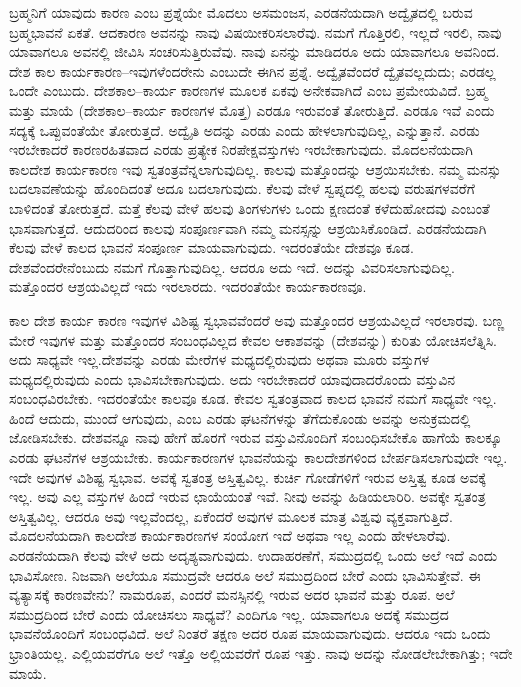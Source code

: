 ಬ್ರಹ್ಮನಿಗೆ ಯಾವುದು ಕಾರಣ ಎಂಬ ಪ್ರಶ್ನೆಯೇ ಮೊದಲು ಅಸಮಂಜಸ, ಎರಡನೆಯದಾಗಿ ಅದ್ವೈತದಲ್ಲಿ ಬರುವ ಬ್ರಹ್ಮಭಾವನೆ ಏಕತೆ. ಆದಕಾರಣ ಅವನನ್ನು ನಾವು ವಿಷಯೀಕರಿಸಲಾರೆವು. ನಮಗೆ ಗೊತ್ತಿರಲಿ, ಇಲ್ಲದೆ ಇರಲಿ, ನಾವು ಯಾವಾಗಲೂ ಅವನಲ್ಲಿ ಜೀವಿಸಿ ಸಂಚರಿಸುತ್ತಿರುವೆವು. ನಾವು ಏನನ್ನು ಮಾಡಿದರೂ ಅದು ಯಾವಾಗಲೂ ಅವನಿಂದ. ದೇಶ ಕಾಲ ಕಾರ್ಯಕಾರಣ–ಇವುಗಳೆಂದರೇನು ಎಂಬುದೇ ಈಗಿನ ಪ್ರಶ್ನೆ. ಅದ್ವೈತವೆಂದರೆ ದ್ವೈತವಲ್ಲದುದು; ಎರಡಲ್ಲ ಒಂದೇ ಎಂಬುದು. ದೇಶಕಾಲ–ಕಾರ್ಯ ಕಾರಣಗಳ ಮೂಲಕ ಏಕವು ಅನೇಕವಾಗಿದೆ ಎಂಬ ಪ್ರಮೇಯವಿದೆ. ಬ್ರಹ್ಮ ಮತ್ತು ಮಾಯೆ (ದೇಶಕಾಲ–ಕಾರ್ಯ ಕಾರಣಗಳ ಮೊತ್ತ) ಎರಡೂ ಇರುವಂತೆ ತೋರುತ್ತಿದೆ. ಎರಡೂ ಇವೆ ಎಂದು ಸದ್ಯಕ್ಕೆ  ಒಪ್ಪುವಂತೆಯೇ ತೋರುತ್ತದೆ. ಅದ್ವೈತಿ ಅದನ್ನು ಎರಡು ಎಂದು ಹೇಳಲಾಗುವುದಿಲ್ಲ, ಎನ್ನುತ್ತಾನೆ. ಎರಡು ಇರಬೇಕಾದರೆ ಕಾರಣರಹಿತವಾದ ಎರಡು ಪ್ರತ್ಯೇಕ ನಿರಪೇಕ್ಷವಸ್ತುಗಳು ಇರಬೇಕಾಗುವುದು. ಮೊದಲನೆಯದಾಗಿ ಕಾಲದೇಶ ಕಾರ್ಯಕಾರಣ ಇವು ಸ್ವತಂತ್ರವೆನ್ನಲಾಗುವುದಿಲ್ಲ. ಕಾಲವು ಮತ್ತೊಂದನ್ನು ಆಶ್ರಯಿಸಬೇಕು. ನಮ್ಮ ಮನಸ್ಸು ಬದಲಾವಣೆಯನ್ನು ಹೊಂದಿದಂತೆ ಅದೂ ಬದಲಾಗುವುದು. ಕೆಲವು ವೇಳೆ ಸ್ವಪ್ನದಲ್ಲಿ ಹಲವು ವರುಷಗಳವರೆಗೆ ಬಾಳಿದಂತೆ ತೋರುತ್ತದೆ. ಮತ್ತೆ ಕೆಲವು ವೇಳೆ ಹಲವು ತಿಂಗಳುಗಳು ಒಂದು ಕ್ಷಣದಂತೆ ಕಳೆದುಹೋದವು ಎಂಬಂತೆ ಭಾಸವಾಗುತ್ತದೆ. ಆದುದರಿಂದ ಕಾಲವು ಸಂಪೂರ್ಣವಾಗಿ ನಮ್ಮ ಮನಸ್ಸನ್ನು ಆಶ್ರಯಿಸಿಕೊಂಡಿದೆ. ಎರಡನೆಯದಾಗಿ ಕೆಲವು ವೇಳೆ ಕಾಲದ ಭಾವನೆ ಸಂಪೂರ್ಣ ಮಾಯವಾಗುವುದು. ಇದರಂತೆಯೇ ದೇಶವೂ ಕೂಡ. ದೇಶವೆಂದರೇನೆಂಬುದು ನಮಗೆ ಗೊತ್ತಾಗುವುದಿಲ್ಲ. ಆದರೂ ಅದು ಇದೆ. ಅದನ್ನು ವಿವರಿಸಲಾಗುವುದಿಲ್ಲ. ಮತ್ತೊಂದರ ಆಶ್ರಯವಿಲ್ಲದೆ ಇದು ಇರಲಾರದು. ಇದರಂತೆಯೇ ಕಾರ್ಯಕಾರಣವೂ.

ಕಾಲ ದೇಶ ಕಾರ್ಯ ಕಾರಣ ಇವುಗಳ ವಿಶಿಷ್ಟ ಸ್ವಭಾವವೆಂದರೆ ಅವು ಮತ್ತೊಂದರ ಆಶ್ರಯವಿಲ್ಲದೆ ಇರಲಾರವು. ಬಣ್ಣ ಮೇರೆ ಇವುಗಳ ಮತ್ತು ಮತ್ತೊಂದರ ಸಂಬಂಧವಿಲ್ಲದ ಕೇವಲ ಆಕಾಶವನ್ನು (ದೇಶವನ್ನು) ಕುರಿತು ಯೋಚಿಸಲೆತ್ನಿಸಿ. ಅದು ಸಾಧ್ಯವೇ ಇಲ್ಲ.\break ದೇಶವನ್ನು ಎರಡು ಮೇರೆಗಳ ಮಧ್ಯದಲ್ಲಿರುವುದು ಅಥವಾ ಮೂರು ವಸ್ತುಗಳ ಮಧ್ಯದಲ್ಲಿರುವುದು ಎಂದು ಭಾವಿಸಬೇಕಾಗುವುದು. ಅದು ಇರಬೇಕಾದರೆ ಯಾವುದಾದರೊಂದು ವಸ್ತುವಿನ ಸಂಬಂಧವಿರಬೇಕು. ಇದರಂತೆಯೇ ಕಾಲವೂ ಕೂಡ. ಕೇವಲ ಸ್ವತಂತ್ರವಾದ ಕಾಲದ ಭಾವನೆ ನಮಗೆ ಸಾಧ್ಯವೇ ಇಲ್ಲ. ಹಿಂದೆ ಆದುದು, ಮುಂದೆ ಆಗುವುದು, ಎಂಬ ಎರಡು ಘಟನೆಗಳನ್ನು ತೆಗೆದುಕೊಂಡು ಅವನ್ನು ಅನುಕ್ರಮದಲ್ಲಿ ಜೋಡಿಸಬೇಕು. ದೇಶವನ್ನೂ ನಾವು ಹೇಗೆ ಹೊರಗೆ ಇರುವ ವಸ್ತುವಿನೊಂದಿಗೆ ಸಂಬಂಧಿಸಬೇಕೊ ಹಾಗೆಯೆ ಕಾಲಕ್ಕೂ ಎರಡು ಘಟನೆಗಳ ಆಶ್ರಯಬೇಕು. ಕಾರ್ಯಕಾರಣಗಳ ಭಾವನೆಯನ್ನು ಕಾಲದೇಶಗಳಿಂದ ಬೇರ್ಪಡಿಸಲಾಗುವುದೇ ಇಲ್ಲ. ಇದೇ ಅವುಗಳ ವಿಶಿಷ್ಟ ಸ್ವಭಾವ. ಅವಕ್ಕೆ ಸ್ವತಂತ್ರ ಅಸ್ತಿತ್ವವಿಲ್ಲ. ಕುರ್ಚಿ ಗೋಡೆಗಳಿಗೆ ಇರುವ ಅಸ್ತಿತ್ವ ಕೂಡ ಅವಕ್ಕೆ ಇಲ್ಲ. ಅವು ಎಲ್ಲ ವಸ್ತುಗಳ ಹಿಂದೆ ಇರುವ ಛಾಯೆಯಂತೆ ಇವೆ. ನೀವು ಅವನ್ನು ಹಿಡಿಯಲಾರಿರಿ. ಅವಕ್ಕೇ ಸ್ವತಂತ್ರ ಅಸ್ತಿತ್ವವಿಲ್ಲ. ಆದರೂ ಅವು ಇಲ್ಲವೆಂದಲ್ಲ, ಏಕೆಂದರೆ ಅವುಗಳ ಮೂಲಕ ಮಾತ್ರ ವಿಶ್ವವು ವ್ಯಕ್ತವಾಗುತ್ತಿದೆ. ಮೊದಲನೆಯದಾಗಿ ಕಾಲದೇಶ ಕಾರ್ಯಕಾರಣಗಳ ಸಂಯೋಗ ಇದೆ ಅಥವಾ ಇಲ್ಲ ಎಂದು ಹೇಳಲಾರೆವು. ಎರಡನೆಯದಾಗಿ ಕೆಲವು ವೇಳೆ ಅದು ಅದೃಶ್ಯವಾಗುವುದು. ಉದಾಹರಣೆಗೆ, ಸಮುದ್ರದಲ್ಲಿ ಒಂದು ಅಲೆ ಇದೆ ಎಂದು ಭಾವಿಸೋಣ. ನಿಜವಾಗಿ ಅಲೆಯೂ ಸಮುದ್ರವೇ ಆದರೂ ಅಲೆ ಸಮುದ್ರದಿಂದ ಬೇರೆ ಎಂದು ಭಾವಿಸುತ್ತೇವೆ. ಈ ವ್ಯತ್ಯಾಸಕ್ಕೆ ಕಾರಣವೇನು? ನಾಮರೂಪ, ಎಂದರೆ ಮನಸ್ಸಿನಲ್ಲಿ ಇರುವ ಅದರ ಭಾವನೆ ಮತ್ತು ರೂಪ. ಅಲೆ ಸಮುದ್ರದಿಂದ ಬೇರೆ ಎಂದು ಯೋಚಿಸಲು ಸಾಧ್ಯವೆ? ಎಂದಿಗೂ ಇಲ್ಲ. ಯಾವಾಗಲೂ ಅದಕ್ಕೆ ಸಮುದ್ರದ ಭಾವನೆಯೊಂದಿಗೆ ಸಂಬಂಧವಿದೆ. ಅಲೆ ನಿಂತರೆ ತಕ್ಷಣ ಅದರ ರೂಪ ಮಾಯವಾಗುವುದು. ಆದರೂ ಇದು ಒಂದು ಭ್ರಾಂತಿಯಲ್ಲ. ಎಲ್ಲಿಯವರೆಗೂ ಅಲೆ ಇತ್ತೊ ಅಲ್ಲಿಯವರೆಗೆ ರೂಪ ಇತ್ತು. ನಾವು ಅದನ್ನು ನೋಡಲೇಬೇಕಾಗಿತ್ತು; ಇದೇ ಮಾಯೆ.

